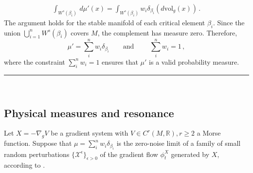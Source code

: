 \documentclass[12pt]{article}
\newcommand{\BlackBox}{\rule{1.5ex}{1.5ex}}  %
\renewenvironment{proof}{\par\noindent{\bf Proof\ }}{\hfill\BlackBox\\[2mm]}
\newenvironment{proof}{\par\noindent{\bf Proof\ }}{\hfill\BlackBox\\[2mm]}
\begin{document}
\begin{proof}
    \begin{align}
        \int_{W^s(\beta_i)} \, d \mu'(x) = \int_{W^s(\beta_i)} w_i \delta_{\beta_{i}} \left(d\text{vol}_g(x) \right) \nonumber \, .
    \end{align}
    The argument holds for the stable manifold of each critical element $\beta_i$. Since the union $\bigcup_{i=1}^n W^s(\beta_i)$ covers $M$, the complement has measure zero. Therefore, 
    \begin{equation*}
        \mu' = \sum_i^n w_i \delta_{\beta_i}  \qquad \text{and } \qquad \sum_i^n w_i = 1 \, ,
    \end{equation*}
     where the constraint $\sum_i^n w_i = 1$ ensures that $\mu'$ is a valid probability measure.
\end{proof}


\subsection{Physical measures and resonance}
\label{subsubsection:issues-with-globally-defined-measures}
Let $X = -\nabla_g V$ be a gradient system with $V\in C^{r}(M,\mathbb{R}), r\geq 2$ a Morse function. Suppose that $\mu = \sum_i^n w_i \delta_{\beta_i}$ is the zero-noise limit of a family of small random perturbations $\{\mathcal{X^{\epsilon}}\}_{\epsilon >0}$ of the gradient flow $\phi_t^X$ generated by $X$, according to . 
\end{document}
